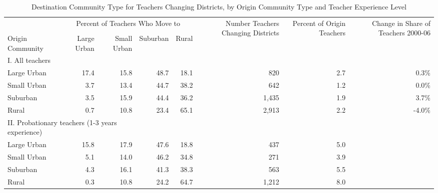 \documentclass[12pt,]{article}
\begin{document}
\begin{sidewaystable}[htbp]
\centering
\begin{tabular}{lrrrrrrr}
  \hline
 & \multicolumn{4}{c}{\multirow{2}{*}{Percent of Teachers Who Move to}} & \multirow{4}{*}{\parbox{0.09\linewidth}{Number Teachers Changing Districts}} & \multirow{4}{*}{\parbox{0.07\linewidth}{Percent of Origin Teachers}} & \multirow{4}{*}{\parbox{0.07\linewidth}{Change in Share of Teachers 2000-06}}\\
 & \multicolumn{4}{c}{} & & & \\ \cline{2-5}
& & & & & & & \\
Origin Community & Large Urban & Small Urban & Suburban & Rural &  &  &  \\ 
  \hline
I. All teachers & & & & & & & \\
\quad Large Urban & 17.4 & 15.8 & 48.7 & 18.1 & 820 & 2.7 & 0.3\% \\ 
  \quad Small Urban & 3.7 & 13.4 & 44.7 & 38.2 & 642 & 1.2 & 0.0\% \\ 
  \quad Suburban & 3.5 & 15.9 & 44.4 & 36.2 & 1,435 & 1.9 & 3.7\% \\ 
  \quad Rural & 0.7 & 10.8 & 23.4 & 65.1 & 2,913 & 2.2 & -4.0\% \\ 
\multicolumn{3}{l}{II. Probationary teachers (1-3 years experience)} & & & & & \\
  \quad Large Urban & 15.8 & 17.9 & 47.6 & 18.8 & 437 & 5.0 &  \\ 
  \quad Small Urban & 5.1 & 14.0 & 46.2 & 34.8 & 271 & 3.9 &  \\ 
  \quad Suburban & 4.3 & 16.1 & 41.3 & 38.3 & 563 & 5.5 &  \\ 
  \quad Rural & 0.3 & 10.8 & 24.2 & 64.7 & 1,212 & 8.0 &  \\ 
   \hline
\end{tabular}
\caption{Destination Community Type for Teachers Changing Districts, by Origin Community Type and Teacher Experience Level} 
\label{tbl:markov}
\end{sidewaystable}
\end{document}
